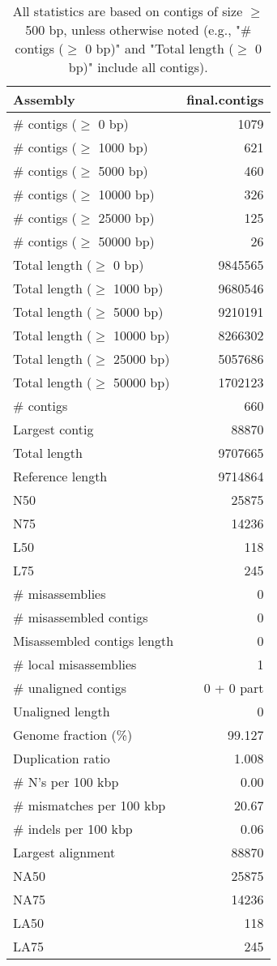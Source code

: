 \documentclass[12pt,a4paper]{article}
\begin{document}
\begin{table}[ht]
\begin{center}
\caption{All statistics are based on contigs of size $\geq$ 500 bp, unless otherwise noted (e.g., "\# contigs ($\geq$ 0 bp)" and "Total length ($\geq$ 0 bp)" include all contigs).}
\begin{tabular}{|l*{1}{|r}|}
\hline
Assembly & final.contigs \\ \hline
\# contigs ($\geq$ 0 bp) & 1079 \\ \hline
\# contigs ($\geq$ 1000 bp) & 621 \\ \hline
\# contigs ($\geq$ 5000 bp) & 460 \\ \hline
\# contigs ($\geq$ 10000 bp) & 326 \\ \hline
\# contigs ($\geq$ 25000 bp) & 125 \\ \hline
\# contigs ($\geq$ 50000 bp) & 26 \\ \hline
Total length ($\geq$ 0 bp) & 9845565 \\ \hline
Total length ($\geq$ 1000 bp) & 9680546 \\ \hline
Total length ($\geq$ 5000 bp) & 9210191 \\ \hline
Total length ($\geq$ 10000 bp) & 8266302 \\ \hline
Total length ($\geq$ 25000 bp) & 5057686 \\ \hline
Total length ($\geq$ 50000 bp) & 1702123 \\ \hline
\# contigs & 660 \\ \hline
Largest contig & 88870 \\ \hline
Total length & 9707665 \\ \hline
Reference length & 9714864 \\ \hline
N50 & 25875 \\ \hline
N75 & 14236 \\ \hline
L50 & 118 \\ \hline
L75 & 245 \\ \hline
\# misassemblies & 0 \\ \hline
\# misassembled contigs & 0 \\ \hline
Misassembled contigs length & 0 \\ \hline
\# local misassemblies & 1 \\ \hline
\# unaligned contigs & 0 + 0 part \\ \hline
Unaligned length & 0 \\ \hline
Genome fraction (\%) & 99.127 \\ \hline
Duplication ratio & 1.008 \\ \hline
\# N's per 100 kbp & 0.00 \\ \hline
\# mismatches per 100 kbp & 20.67 \\ \hline
\# indels per 100 kbp & 0.06 \\ \hline
Largest alignment & 88870 \\ \hline
NA50 & 25875 \\ \hline
NA75 & 14236 \\ \hline
LA50 & 118 \\ \hline
LA75 & 245 \\ \hline
\end{tabular}
\end{center}
\end{table}
\end{document}
